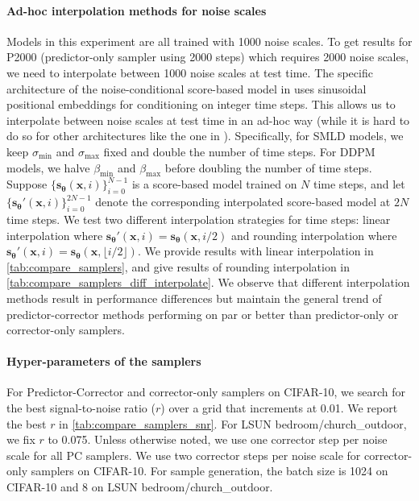 \documentclass{article} \usepackage{iclr2021_conference,times}
\newcommand{\bfx}{\mathbf{x}}
\newcommand{\bftheta}{{\boldsymbol{\theta}}}
\newcommand{\bfs}{\mathbf{s}}
\newcommand{\sm}{\sigma_{\text{min}}}
\newcommand{\sM}{\sigma_{\text{max}}}
\newcommand{\betam}{\beta_{\text{min}}}
\newcommand{\betaM}{\beta_{\text{max}}}
\begin{document}
\paragraph{Ad-hoc interpolation methods for noise scales} 
Models in this experiment are all trained with 1000 noise scales. To get results for P2000 (predictor-only sampler using 2000 steps) which requires 2000 noise scales, we need to interpolate between 1000 noise scales at test time. The specific architecture of the noise-conditional score-based model in \citet{ho2020denoising} uses sinusoidal positional embeddings for conditioning on integer time steps. This allows us to interpolate between noise scales at test time in an ad-hoc way (while it is hard to do so for other architectures like the one in \citet{song2019generative}). Specifically, for SMLD models, we keep $\sm$ and $\sM$ fixed and double the number of time steps. For DDPM models, we halve $\betam$ and $\betaM$ before doubling the number of time steps. Suppose $\{\bfs_\bftheta(\bfx, i)\}_{i=0}^{N-1}$ is a score-based model trained on $N$ time steps, and let $\{\bfs_\bftheta'(\bfx, i)\}_{i=0}^{2N-1}$ denote the corresponding interpolated score-based model at $2N$ time steps. We test two different interpolation strategies for time steps: linear interpolation where $\bfs_\bftheta'(\bfx, i) = \bfs_\bftheta(\bfx, i / 2)$ and rounding interpolation where $\bfs_\bftheta'(\bfx, i) = \bfs_\bftheta(\bfx, \lfloor i/2 \rfloor)$. We provide results with linear interpolation in \cref{tab:compare_samplers}, and give results of rounding interpolation in \cref{tab:compare_samplers_diff_interpolate}. We observe that different interpolation methods result in performance differences but maintain the general trend of predictor-corrector methods performing on par or better than predictor-only or corrector-only samplers.

\paragraph{Hyper-parameters of the samplers}
For Predictor-Corrector and corrector-only samplers on CIFAR-10, we search for the best signal-to-noise ratio ($r$) over a grid that increments at 0.01. We report the best $r$ in \cref{tab:compare_samplers_snr}. For LSUN bedroom/church\_outdoor, we fix $r$ to 0.075. Unless otherwise noted, we use one corrector step per noise scale for all PC samplers. We use two corrector steps per noise scale for corrector-only samplers on CIFAR-10. For sample generation, the batch size is 1024 on CIFAR-10 and 8 on LSUN bedroom/church\_outdoor. 
\end{document}
